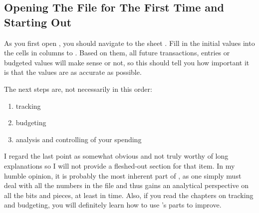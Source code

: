 \subsection{Opening The File for The First Time and Starting Out}
\label{subsec:opening-the-file}

As you first open \tfn, you should navigate to the sheet .
Fill in the initial values into the cells in columns  to .
Based on them, all future transactions, entries or budgeted values will make sense or not, so this should tell you how important it is that the values are as accurate as possible.

The next steps are, not necessarily in this order:
\begin{enumerate}
	\item tracking
	\item budgeting
	\item analysis and controlling of your spending
\end{enumerate}

I regard the last point as somewhat obvious and not truly worthy of long explanations so I will not provide a fleshed-out section for that item.
In my humble opinion, it is probably the most inherent part of \tfn, as one simply must deal with all the numbers in the file and thus gains an analytical perspective on all the bits and pieces, at least in time.
Also, if you read the chapters on tracking and budgeting, you will definitely learn how to use \tfn's parts to improve.
